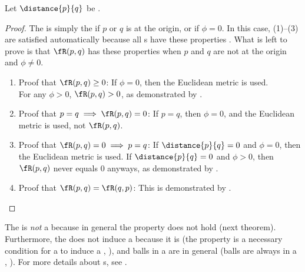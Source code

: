 \begin{theorem}
\label{thm:larc_distance}
Let $\distance{p}{q}$ be  .
\\
\end{theorem}
\begin{proof}
The   is simply the  
if $p$ or $q$ is at the origin, or if $\phi=0$.
In this case, (1)--(3) are satisfied automatically because all s have these properties .
What is left to prove is that $\fR(p,q)$ has these properties when $p$ and $q$ are not at the origin and 
$\phi\neq0$.
\begin{enumerate}
  \item Proof that $\fR(p,q)\ge0$: If $\phi=0$, then the Euclidean metric is used.\\
        For any $\phi>0$, $\fR(p,q)>0$, as demonstrated by .
  \item Proof that $p=q\implies\fR(p,q)=0$: If $p=q$, then $\phi=0$, and the Euclidean metric is used, not $\fR(p,q)$.
  \item Proof that $\fR(p,q)=0\implies p=q$:
        If $\distance{p}{q}=0$ and $\phi=0$, then the Euclidean metric is used.
        If $\distance{p}{q}=0$ and $\phi>0$, then $\fR(p,q)$ never equals $0$ anyways, as demonstrated by .
  \item Proof that $\fR(p,q)=\fR(q,p)$: This is demonstrated by .
\end{enumerate}
\end{proof}




The  is \emph{not} a  because in general the 
 property does not hold (next theorem).
Furthermore, the  does not induce a 
because it is 
(the  property is a necessary condition for a  to induce a , 
),
and balls in a  are in general 
(balls are always  %
in a , %
). 
For more details about s, see .


